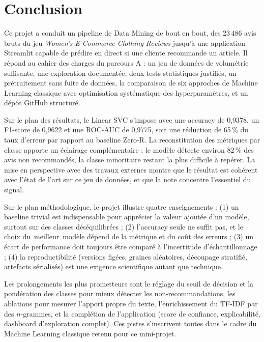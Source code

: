 \documentclass[11pt,a4paper]{report}
\def\og{\guillemotleft\nobreak\,}%
\def\fg{\unskip\nobreak\,\guillemotright}%
\newcommand{\gl}[1]{\og #1\fg{}}       %
\numberwithin{equation}{chapter}
\begin{document}
\chapter{Conclusion}\label{chap:conclusion}
Ce projet a conduit un pipeline de Data Mining de bout en bout, des 23\,486 avis bruts du jeu \textit{Women's E-Commerce Clothing Reviews} jusqu'à une application Streamlit capable de prédire en direct si une cliente recommande un article. Il répond au cahier des charges du parcours A : un jeu de données de volumétrie suffisante, une exploration documentée, deux tests statistiques justifiés, un prétraitement sans fuite de données, la comparaison de six approches de Machine Learning classique avec optimisation systématique des hyperparamètres, et un dépôt GitHub structuré.

Sur le plan des résultats, le Linear SVC s'impose avec une accuracy de 0,9378, un F1-score de 0,9622 et une ROC-AUC de 0,9775, soit une réduction de 65\,\% du taux d'erreur par rapport au baseline Zero-R. La reconstitution des métriques par classe apporte un éclairage complémentaire : le modèle détecte environ 82\,\% des avis non recommandés, la classe minoritaire restant la plus difficile à repérer. La mise en perspective avec des travaux externes montre que le résultat est cohérent avec l'état de l'art sur ce jeu de données, et que la note concentre l'essentiel du signal.

Sur le plan méthodologique, le projet illustre quatre enseignements : (1) un baseline trivial est indispensable pour apprécier la valeur ajoutée d'un modèle, surtout sur des classes déséquilibrées ; (2) l'accuracy seule ne suffit pas, et le choix du \gl{meilleur} modèle dépend de la métrique et du coût des erreurs ; (3) un écart de performance doit toujours être comparé à l'incertitude d'échantillonnage ; (4) la reproductibilité (versions figées, graines aléatoires, découpage stratifié, artefacts sérialisés) est une exigence scientifique autant que technique.

Les prolongements les plus prometteurs sont le réglage du seuil de décision et la pondération des classes pour mieux détecter les non-recommandations, les ablations pour mesurer l'apport propre du texte, l'enrichissement du TF-IDF par des $n$-grammes, et la complétion de l'application (score de confiance, explicabilité, dashboard d'exploration complet). Ces pistes s'inscrivent toutes dans le cadre du Machine Learning classique retenu pour ce mini-projet.
\end{document}
